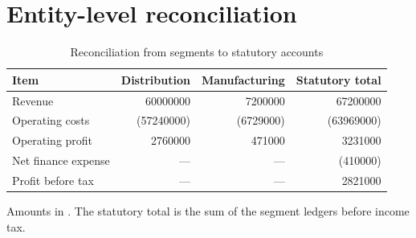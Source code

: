 \section{Entity-level reconciliation}
\begin{table}[htbp]
  \centering
  \caption{Reconciliation from segments to statutory accounts}
  \begin{tabularx}{\textwidth}{@{}Y r r r@{}}
    \toprule
    \textbf{Item} & \textbf{Distribution} & \textbf{Manufacturing} &
      \textbf{Statutory total}\\
    \midrule
    Revenue & \num{60000000} & \num{7200000} & \num{67200000}\\
    Operating costs & (\num{57240000}) & (\num{6729000}) & (\num{63969000})\\
    Operating profit & \num{2760000} & \num{471000} & \num{3231000}\\
    Net finance expense & --- & --- & (\num{410000})\\
    Profit before tax & --- & --- & \num{2821000}\\
    \bottomrule
  \end{tabularx}
  \begin{flushleft}\footnotesize Amounts in \Currency. The statutory total is the sum
  of the segment ledgers before income tax.\end{flushleft}
\end{table}
